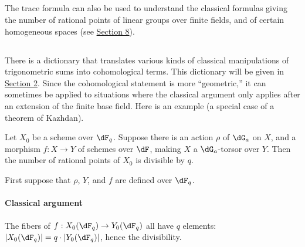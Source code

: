 \subsection{}\label{VI:1-11}

The trace formula can also be used to understand the classical formulas 
giving the number of rational points of linear groups over 
finite fields, and of certain homogeneous spaces (see \hyperref[VI:8]{Section 8}). 





\subsection{}\label{VI:1-12}

There is a dictionary that translates various kinds of classical 
manipulations of trigonometric sums into cohomological terms. This dictionary 
will be given in \hyperref[VI:2]{Section 2}. Since the cohomological statement is more 
``geometric,'' it can sometimes be applied 
to situations where the classical argument only applies after an 
extension of the finite base field. Here is an example (a special case of a 
theorem of Kazhdan).

\begin{theorem_}[Kazhdan]\label{VI:1-13}
Let $X_0$ be a scheme over $\dF_q$. Suppose there is an action $\rho$ of 
$\dG_a$ on $X$, and a morphism $f:X\to Y$ of schemes over $\dF$, making 
$X$ a $\dG_a$-torsor over $Y$. Then the number of rational points of $X_0$ 
is divisible by $q$.
\end{theorem_}

First suppose that $\rho$, $Y$, and $f$ are defined over $\dF_q$. 


\paragraph{Classical argument}
The fibers of $f:X_0(\dF_q)\to Y_0(\dF_q)$ all have $q$ elements: 
$|X_0(\dF_q)| = q\cdot |Y_0(\dF_q)|$, hence the divisibility. 


